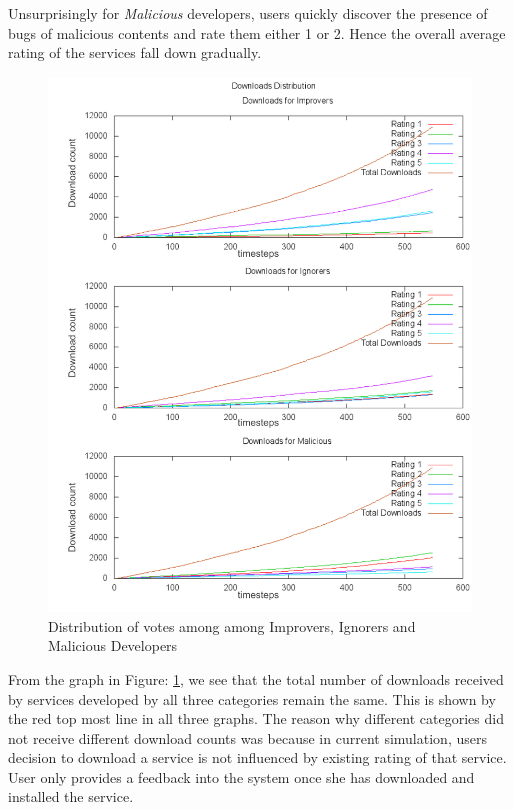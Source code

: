 Unsurprisingly for \emph{Malicious} developers, users quickly discover the presence of bugs of malicious contents and rate them either 1 or 2. Hence the overall average rating of the services fall down gradually.

\begin{figure}[!htb]
  \centering
  \includegraphics[width=13.5cm]{figures/plot_downloads_segregated.pdf}
  \caption{Distribution of votes among among Improvers, Ignorers and Malicious Developers}
  \label{fig:plot_downloads_segregated}
\end{figure}

From the graph in Figure: \ref{fig:plot_downloads_segregated}, we see that the total number of downloads received by services developed by all three categories remain the same. This is shown by the red top most line in all three graphs. The reason why different categories did not receive different download counts was because in current simulation, users decision to download a service is not influenced by existing rating of that service. User only provides a feedback into the system once she has downloaded and installed the service.

